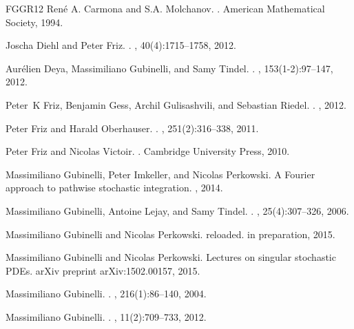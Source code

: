 \documentclass[a4paper,11pt]{article}
\theoremstyle{remark}
\begin{document}
\begin{thebibliography}{FGGR12}
Ren\'e A. Carmona and S.A. Molchanov.
.
\newblock American Mathematical Society, 1994.

Joscha Diehl and Peter Friz.
.
, 40(4):1715--1758, 2012.

Aur{\'e}lien Deya, Massimiliano Gubinelli, and Samy Tindel.
.
, 153(1-2):97--147, 2012.

Peter~K Friz, Benjamin Gess, Archil Gulisashvili, and Sebastian Riedel.
.
, 2012.

Peter Friz and Harald Oberhauser.
.
, 251(2):316--338, 2011.

Peter Friz and Nicolas Victoir.
.
\newblock Cambridge University Press, 2010.

Massimiliano Gubinelli, Peter Imkeller, and Nicolas Perkowski.
\newblock A {F}ourier approach to pathwise stochastic integration.
, 2014.

Massimiliano Gubinelli, Antoine Lejay, and Samy Tindel.
.
, 25(4):307--326, 2006.

Massimiliano Gubinelli and Nicolas Perkowski.
 reloaded.
\newblock in preparation, 2015.

Massimiliano Gubinelli and Nicolas Perkowski.
\newblock Lectures on singular stochastic {PDE}s.
\newblock arXiv preprint arXiv:1502.00157, 2015.

Massimiliano Gubinelli.
.
, 216(1):86--140, 2004.

Massimiliano Gubinelli.
.
, 11(2):709--733, 2012.


\end{thebibliography}
\end{document}
